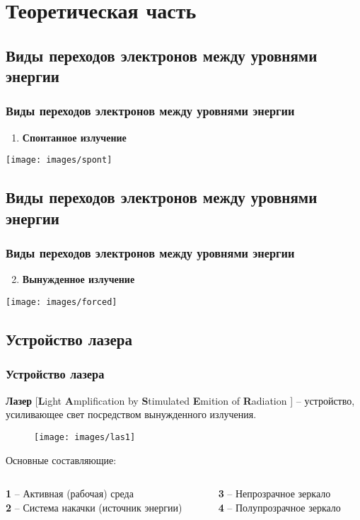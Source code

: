 \documentclass[10pt,pdf,hyperref={unicode}, dvipsnames]{beamer}
\newcommand\frametitless[1]{\subsection{#1}\frametitle{#1}}
\begin{document}
\section{Теоретическая часть}
\begin{frame}[t]
	\frametitless{Виды переходов электронов между уровнями энергии}
	\begin{enumerate}
		\item \textbf{Спонтанное излучение}
	\end{enumerate}
	\begin{center}
		\texttt{[image: images/spont]}
	\end{center}
\end{frame}
\begin{frame}[t]
	\frametitless{Виды переходов электронов между уровнями энергии}
	\begin{enumerate}
		\setcounter{enumi}{1}	
		\item \textbf{Вынужденное излучение}
	\end{enumerate}
	\begin{center}
		\texttt{[image: images/forced]}
	\end{center}
\end{frame}
\begin{frame}[t] 
	\frametitless{Устройство лазера}
	\textbf{Лазер} [\textbf{L}ight \textbf{A}mplification by \textbf{S}timulated \textbf{E}mition of \textbf{R}adiation ] -- устройство, усиливающее свет посредством вынужденного излучения.

	\begin{figure}[h]
		\centering
		\texttt{[image: images/las1]}
	\end{figure}	




	Основные составляющие:
		\vspace{1em}
	\begin{columns}[t]
		\begin{column}{0.45\textwidth}
				\textbf{1} -- Активная (рабочая) среда\\
				\textbf{2} -- Система накачки (источник энергии)
		\end{column}
		\begin{column}{0.45\textwidth}
				\textbf{3} -- Непрозрачное зеркало\\
				\textbf{4} -- Полупрозрачное зеркало
		\end{column}
	\end{columns}
\end{frame}
\end{document}
